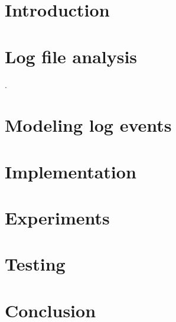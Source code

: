 \chapter{Introduction}
\label{chap:introduction}


\chapter{Log file analysis}
\label{chap:theory}
. 


\chapter{Modeling log events}
\label{chap:modeling}


\chapter{Implementation}
\label{chap:implementation}


\chapter{Experiments}
\label{chap:experiments}


\chapter{Testing}
\label{chap:testing}


\chapter{Conclusion}
\label{chap:conclusion}
